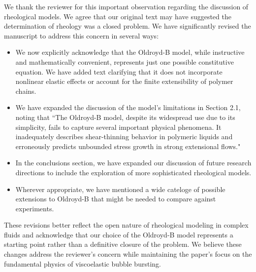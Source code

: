 \documentclass[]{article}
\newcommand{\AKD}[1]{{\textcolor{magenta}{#1}}}
\begin{document}
\begin{enumerate}
\begin{enumerate}
        We thank the reviewer for this important observation regarding the discussion of rheological models. We agree that our original text may have suggested the determination of rheology was a closed problem. We have significantly revised the manuscript to address this concern in several ways:

        \begin{itemize}
            \item We now explicitly acknowledge that the Oldroyd-B model, while instructive and mathematically convenient, represents just one possible constitutive equation. We have added text clarifying that it does not incorporate nonlinear elastic effects or account for the finite extensibility of polymer chains.
        
            \item We have expanded the discussion of the model's limitations in Section 2.1, noting that ``The Oldroyd-B model, despite its widespread use due to its simplicity, fails to capture several important physical phenomena. It inadequately describes shear-thinning behavior in polymeric liquids and erroneously predicts unbounded stress growth in strong extensional flows."
            \item In the conclusions section, we have expanded our discussion of future research directions to include the exploration of more sophisticated rheological models.
            \item Wherever appropriate, we have mentioned a wide cateloge of possible extensions to Oldroyd-B that might be needed to compare against experiments.
        \end{itemize}

        These revisions better reflect the open nature of rheological modeling in complex fluids and acknowledge that our choice of the Oldroyd-B model represents a starting point rather than a definitive closure of the problem. We believe these changes address the reviewer's concern while maintaining the paper's focus on the fundamental physics of viscoelastic bubble bursting.




\end{enumerate}
\end{enumerate}
\end{document}
